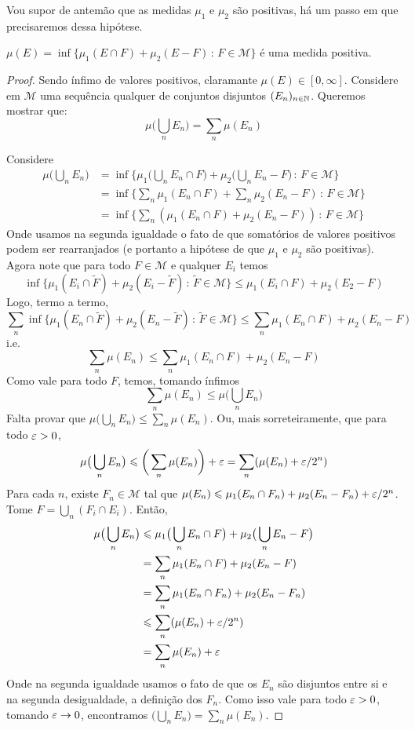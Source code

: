 \prob
Vou supor de antemão que as medidas $\mu_1$ e $\mu_2$ são positivas, há um passo em que precisaremos dessa hipótese.
\begin{prop}
    $\mu(E) = \inf \{\mu_1(E \cap F) +  \mu_2(E - F) \, : \, F \in \mathcal{M}\}$ é uma medida positiva.
\end{prop}
\begin{proof}
    Sendo ínfimo de valores positivos, claramante $\mu(E) \in [0,\infty]$. Considere em $\mathcal{M}$ uma sequência qualquer de conjuntos 
    disjuntos $(E_n)_{n \in \mathbb{N}}$. Queremos mostrar que:
    $$\mu \bigg(\bigcup_{n} E_n \bigg) = \sum_{n} \mu(E_n)$$

    Considere
    \begin{align*}
        \mu \bigg(\bigcup_{n} E_n \bigg) &= \inf \bigg\{\mu_1\bigg( \bigcup_n E_n \cap F \bigg) + \mu_2\bigg( \bigcup_n E_n - F \bigg) \, : \, F \in \mathcal{M} \bigg\}\\
        &= \inf \bigg\{ \sum_n \mu_1(E_n \cap F) + \sum_n \mu_2(E_n - F) \, : \, F \in \mathcal{M} \bigg\}\\
        &= \inf \bigg\{ \sum_n ( \mu_1(E_n \cap F) + \mu_2(E_n - F) ) \, : \, F \in \mathcal{M} \bigg\}
    \end{align*}
    Onde usamos na segunda igualdade o fato de que somatórios de valores positivos podem ser rearranjados (e portanto a hipótese de que $\mu_1$ e $\mu_2$ são positivas).
    Agora note que para todo $F \in \mathcal{M}$ e qualquer $E_i$ temos
    $$\inf\{\mu_1(E_i \cap \tilde{F}) + \mu_2(E_i - \tilde{F}) \, : \, \tilde{F} \in \mathcal{M}\} \leq \mu_1(E_i \cap F) + \mu_2(E_2 - F)$$
    Logo, termo a termo,
    $$\sum_n \inf\{\mu_1(E_n \cap \tilde{F}) + \mu_2(E_n - \tilde{F}) \, : \, \tilde{F} \in \mathcal{M}\} \leq \sum_n \mu_1(E_n \cap F) + \mu_2(E_n - F)$$
    i.e.
    $$\sum_{n} \mu(E_n) \leq \sum_n \mu_1(E_n \cap F) + \mu_2(E_n - F)$$
    Como vale para todo $F$, temos, tomando ínfimos
    $$\sum_{n} \mu(E_n) \leq \mu \bigg(\bigcup_{n} E_n \bigg)$$
    Falta provar que $\mu\big(\bigcup_{n} E_n \big) \leq \sum_{n} \mu(E_n) $. Ou, mais sorreteiramente, que para 
    todo $\varepsilon > 0$,
    $$ \mu\big(\bigcup_{n} E_n \big) \leqslant \bigg(\sum_{n} \mu(E_n)\bigg) + \varepsilon = \sum_{n} (\mu(E_n) + \varepsilon/2^n )$$
    Para cada $n$, existe $F_n \in \mathcal{M}$ tal que $\mu(E_n) \leqslant \mu_1(E_n \cap F_n) + \mu_2(E_n - F_n) + \varepsilon/2^n$.
    Tome $F = \bigcup_n (F_i \cap E_i)$. Então,
    \begin{align*}
        \mu\big(\bigcup_n E_n \big) &\leqslant \mu_1\big( \bigcup_n E_n \cap F\big) +\mu_2\big( \bigcup_n E_n - F\big)\\
        &= \sum_n \mu_1(E_n \cap F) + \mu_2(E_n - F)\\
        &= \sum_n \mu_1(E_n \cap F_n) + \mu_2(E_n - F_n)\\
        &\leqslant \sum_{n} (\mu(E_n) + \varepsilon/2^n)\\
        &= \sum_{n} \mu(E_n) + \varepsilon
    \end{align*}
    Onde na segunda igualdade usamos o fato de que os $E_n$ são disjuntos entre si e na segunda desigualdade, a definição dos $F_n$.
    Como isso vale para todo $\varepsilon > 0$, tomando $\varepsilon \rightarrow 0$, encontramos $ \big(\bigcup_{n} E_n \big) = \sum_{n} \mu(E_n)$.
\end{proof}

